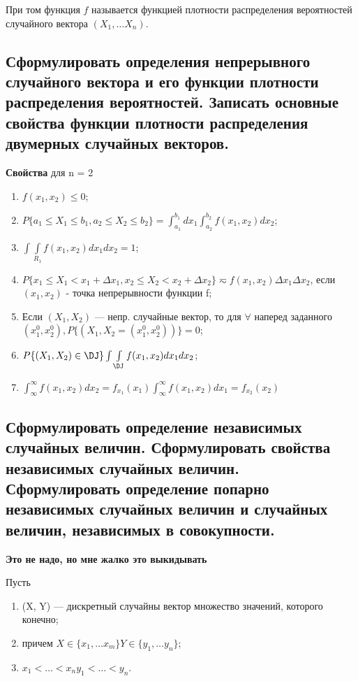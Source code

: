 При том функция $f$ называется функцией плотности распределения вероятностей случайного вектора $(X_1, \dots X_n)$.

\subsection{Сформулировать определения непрерывного случайного вектора и его функции плотности распределения вероятностей. Записать основные свойства функции плотности распределения двумерных случайных векторов.}

\textbf{Свойства} для n = 2

\begin{enumerate}[label=\arabic*.]
	\item $f(x_1, x_2) \leq 0$;
	\item $P\{a_1 \leq X_1 \leq b_1, a_2 \leq X_2 \leq b_2\} = \int_{a_1}^{b_1}dx_1\int_{a_2}^{b_2}f(x_1, x_2)dx_2$;
	\item $\int\int\limits_{R_1} f(x_1, x_2)dx_1dx_2 = 1$;
	\item $P\{x_1 \leq X_1 < x_1 + \Delta x_1, x_2 \leq X_2 < x_2 + \Delta x_2\} \eqsim f(x_1, x_2) \Delta x_1 \Delta x_2$, если $(x_1, x_2)$ - точка непрерывности функции f;
	\item Если $(X_1, X_2)$ --- непр. случайные вектор, то для $\forall$ наперед заданного $(x_1^0, x_2^0), P\{(X_1, X_2 = (x_1^0, x_2^0))\} = 0$;
	\item $P\{(X_1, X_2) \in \DJ\} \int\int\limits_{\DJ}f(x_1, x_2)dx_1dx_2$;
	\item $\int_{\infty}^{\infty}f(x_1, x_2)dx_2 = f_{x_1}(x_1) \int_{\infty}^{\infty}f(x_1, x_2)dx_1 = f_{x_2}(x_2)$
\end{enumerate}

\subsection{Сформулировать определение независимых случайных величин. Сформулировать свойства независимых случайных величин. Сформулировать определение попарно независимых случайных величин и случайных величин, независимых в совокупности.}

\textbf{Это не надо, но мне жалко это выкидывать}

Пусть 
\begin{enumerate}
	\item (X, Y) --- дискретный случайны вектор множество значений, которого конечно;
	\item причем $X \in \{x_1, \dots x_m\} Y \in \{y_1, \dots y_n\}$;
	\item $x_1 < \dots < x_n y_1 < \dots < y_n$.
\end{enumerate}

